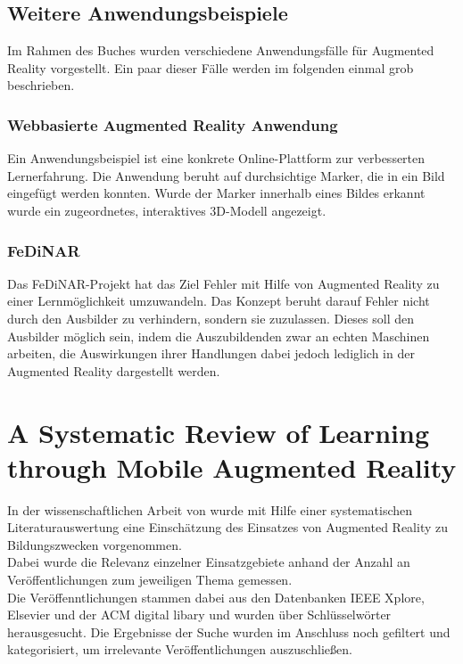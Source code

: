 \subsection{Weitere Anwendungsbeispiele}
Im Rahmen des Buches wurden verschiedene Anwendungsfälle für Augmented Reality vorgestellt. Ein paar dieser Fälle werden im folgenden einmal grob beschrieben.

\subsubsection{Webbasierte Augmented Reality Anwendung}
Ein Anwendungsbeispiel ist eine konkrete Online-Plattform zur verbesserten Lernerfahrung. Die Anwendung beruht auf \glqq durchsichtige\grqq{} Marker, die in ein Bild eingefügt werden konnten. Wurde der Marker innerhalb eines Bildes erkannt wurde ein zugeordnetes, interaktives 3D-Modell angezeigt.

\subsubsection{FeDiNAR}
Das FeDiNAR-Projekt hat das Ziel Fehler mit Hilfe von Augmented Reality zu einer Lernmöglichkeit umzuwandeln. Das Konzept beruht darauf Fehler nicht durch den Ausbilder zu verhindern, sondern sie zuzulassen. Dieses soll den Ausbilder möglich sein, indem die Auszubildenden zwar an echten Maschinen arbeiten, die Auswirkungen ihrer Handlungen dabei jedoch lediglich in der Augmented Reality dargestellt werden. 


\section{A Systematic Review of Learning through Mobile Augmented Reality}
In der wissenschaftlichen Arbeit von \citeauthor{hedberg:review-ar-learning} \citep{hedberg:review-ar-learning} wurde mit Hilfe einer systematischen Literaturauswertung eine Einschätzung des Einsatzes von Augmented Reality zu Bildungszwecken vorgenommen. \\
Dabei wurde die Relevanz einzelner Einsatzgebiete anhand der Anzahl an Veröffentlichungen zum jeweiligen Thema gemessen.\\ Die Veröffenntlichungen stammen dabei aus den Datenbanken \glqq IEEE Xplore\grqq , \glqq Elsevier\grqq{} und der \glqq ACM digital libary\grqq{} und wurden über Schlüsselwörter herausgesucht. Die Ergebnisse der Suche wurden im Anschluss noch gefiltert und kategorisiert, um irrelevante Veröffentlichungen auszuschließen.
